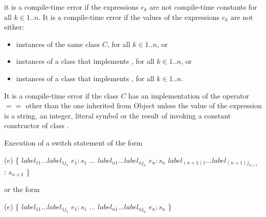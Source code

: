 \documentclass{article}
\newcommand{\code}[1]{{\sf #1}}
\begin{document}
 it is a compile-time error if the expressions $e_k$ are not compile-time constants for all  $k \in 1..n$.  It is a compile-time error if the values of the expressions $e_k$ are not either:
 \begin{itemize}
 \item instances of the same class $C$, for all $k \in 1..n$,  or 
 \item instances of a class that implements , for all $k \in 1..n$,  or 
 \item instances of a class that implements , for all $k \in 1..n$. 
 \end{itemize}
 

\LMHash{}
It is a compile-time error if the class $C$ has an implementation of the operator $==$ other than the one inherited from \code{Object} unless the value of the expression is a string, an integer, literal symbol or the result of invoking a constant constructor of class .
 


\LMHash{}
Execution of a switch statement of the form

\begin{dartCode}
\SWITCH{} ($e$) \{
   $label_{11} \ldots label_{1j_1}$ \CASE{} $e_1: s_1$
   $\ldots$
   $label_{n1} \ldots label_{nj_n}$ \CASE{} $e_n: s_n$
   $label_{(n+1)1} \ldots label_{(n+1)j_{n+1}}$ \DEFAULT{}: $s_{n+1}$
\}
\end{dartCode}
 
or the form 
 
\begin{dartCode}
\SWITCH{} ($e$) \{
   $label_{11} \ldots label_{1j_1}$ \CASE{} $e_1: s_1$
   $\ldots$
   $label_{n1} \ldots label_{nj_n}$ \CASE{} $e_n: s_n$
\}
\end{dartCode}
\end{document}
